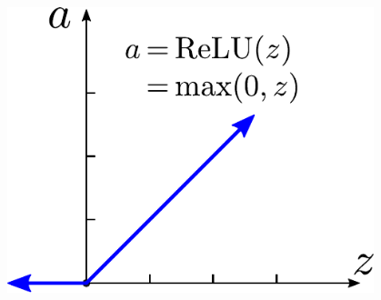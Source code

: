 \documentclass[14pt, t]{beamer}
\begin{document}
\begin{frame}
{\begin{columns}
\begin{itemize}
            \end{itemize}
            \begin{figure}[htb!]
                \centering
                \includegraphics[width=\columnwidth]{vector/relu.pdf}
            \end{figure}
        \end{columns}}
    
    
\end{frame}
\end{document}
